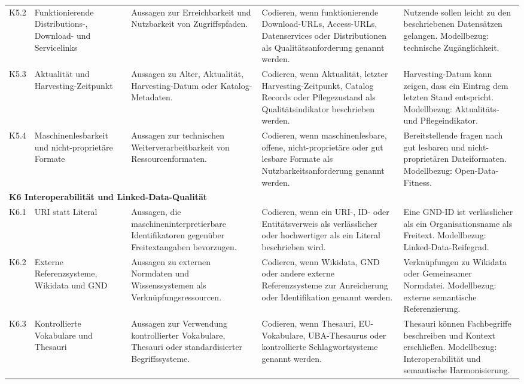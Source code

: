 \begin{longtable}{p{1cm} p{2.5cm} p{3.2cm} p{4.5cm} p{4.5cm}}
K5.2 & Funktionierende Distributions-, Download- und Servicelinks
& Aussagen zur Erreichbarkeit und Nutzbarkeit von Zugriffspfaden.
& Codieren, wenn funktionierende Download-URLs, Access-URLs, Datenservices oder Distributionen als Qualitätsanforderung genannt werden.
& Nutzende sollen leicht zu den beschriebenen Datensätzen gelangen. Modellbezug: technische Zugänglichkeit. \\

K5.3 & Aktualität und Harvesting-Zeitpunkt
& Aussagen zu Alter, Aktualität, Harvesting-Datum oder Katalog-Metadaten.
& Codieren, wenn Aktualität, letzter Harvesting-Zeitpunkt, Catalog Records oder Pflegezustand als Qualitätsindikator beschrieben werden.
& Harvesting-Datum kann zeigen, dass ein Eintrag dem letzten Stand entspricht. Modellbezug: Aktualitäts- und Pflegeindikator. \\

K5.4 & Maschinenlesbarkeit und nicht-proprietäre Formate
& Aussagen zur technischen Weiterverarbeitbarkeit von Ressourcenformaten.
& Codieren, wenn maschinenlesbare, offene, nicht-proprietäre oder gut lesbare Formate als Nutzbarkeitsanforderung genannt werden.
& Bereitstellende fragen nach gut lesbaren und nicht-proprietären Dateiformaten. Modellbezug: Open-Data-Fitness. \\

\midrule
\multicolumn{5}{l}{\textbf{K6 Interoperabilität und Linked-Data-Qualität}} \\
\midrule

K6.1 & URI statt Literal
& Aussagen, die maschineninterpretierbare Identifikatoren gegenüber Freitextangaben bevorzugen.
& Codieren, wenn ein URI-, ID- oder Entitätsverweis als verlässlicher oder hochwertiger als ein Literal beschrieben wird.
& Eine GND-ID ist verlässlicher als ein Organisationsname als Freitext. Modellbezug: Linked-Data-Reifegrad. \\

K6.2 & Externe Referenzsysteme, Wikidata und GND
& Aussagen zu externen Normdaten und Wissenssystemen als Verknüpfungsressourcen.
& Codieren, wenn Wikidata, GND oder andere externe Referenzsysteme zur Anreicherung oder Identifikation genannt werden.
& Verknüpfungen zu Wikidata oder Gemeinsamer Normdatei. Modellbezug: externe semantische Referenzierung. \\

K6.3 & Kontrollierte Vokabulare und Thesauri
& Aussagen zur Verwendung kontrollierter Vokabulare, Thesauri oder standardisierter Begriffssysteme.
& Codieren, wenn Thesauri, EU-Vokabulare, UBA-Thesaurus oder kontrollierte Schlagwortsysteme genannt werden.
& Thesauri können Fachbegriffe beschreiben und Kontext erschließen. Modellbezug: Interoperabilität und semantische Harmonisierung. \\


\end{longtable}
